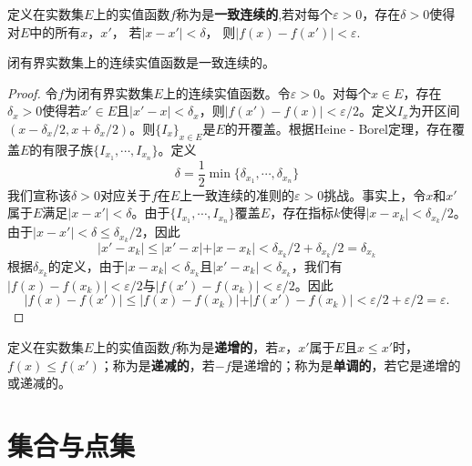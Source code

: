 \documentclass[lang=cn,newtx,10pt,scheme=chinese]{../Template/elegantbook}
\begin{document}
\begin{definition}[一致连续]\label{definition:一致连续}
  定义在实数集\(E\)上的实值函数\(f\)称为是\textbf{一致连续的},若对每个\(\varepsilon>0\)，存在\(\delta>0\)使得对\(E\)中的所有\(x\)，\(x'\)，
若\(\vert x - x'\vert<\delta\)， 则\(\vert f(x) - f(x')\vert<\varepsilon.\)
\end{definition}

\begin{theorem}\label{theorem:闭有界实数集上的连续实值函数是一致连续的。}
  闭有界实数集上的连续实值函数是一致连续的。
\end{theorem}
\begin{proof}
  令\(f\)为闭有界实数集\(E\)上的连续实值函数。令\(\varepsilon>0\)。对每个\(x\in E\)，存在\(\delta_x>0\)使得若\(x'\in E\)且\(\vert x' - x\vert<\delta_x\)，则\(\vert f(x') - f(x)\vert<\varepsilon/2\)。定义\(I_x\)为开区间\((x - \delta_x/2, x+\delta_x/2)\)。则\(\{I_x\}_{x\in E}\)是\(E\)的开覆盖。根据Heine - Borel定理，存在覆盖\(E\)的有限子族\(\{I_{x_1}, \cdots, I_{x_n}\}\)。定义
\[
\delta=\frac{1}{2}\min\{\delta_{x_1},\cdots,\delta_{x_n}\}
\]
我们宣称该\(\delta>0\)对应关于\(f\)在\(E\)上一致连续的准则的\(\varepsilon>0\)挑战。事实上，令\(x\)和\(x'\)属于\(E\)满足\(\vert x - x'\vert<\delta\)。由于\(\{I_{x_1}, \cdots, I_{x_n}\}\)覆盖\(E\)，存在指标\(k\)使得\(\vert x - x_k\vert<\delta_{x_k}/2\)。由于\(\vert x - x'\vert<\delta\leqslant\delta_{x_k}/2\)，因此
\[
\vert x' - x_k\vert\leqslant\vert x' - x\vert+\vert x - x_k\vert<\delta_{x_k}/2+\delta_{x_k}/2=\delta_{x_k}
\]
根据\(\delta_{x_k}\)的定义，由于\(\vert x - x_k\vert<\delta_{x_k}\)且\(\vert x' - x_k\vert<\delta_{x_k}\)，我们有\(\vert f(x) - f(x_k)\vert<\varepsilon/2\)与\(\vert f(x') - f(x_k)\vert<\varepsilon/2\)。因此
\[
\vert f(x) - f(x')\vert\leqslant\vert f(x) - f(x_k)\vert+\vert f(x') - f(x_k)\vert<\varepsilon/2+\varepsilon/2=\varepsilon.
\]
\end{proof}

\begin{definition}[实值函数的单调性]\label{definition:实值函数的单调性}
  定义在实数集\(E\)上的实值函数\(f\)称为是\textbf{递增的}，若\(x\)，\(x'\)属于\(E\)且\(x\leqslant x'\)时，\(f(x)\leqslant f(x')\)；称为是\textbf{递减的}，若\(-f\)是递增的；称为是\textbf{单调的}，若它是递增的或递减的。
\end{definition}




\chapter{集合与点集}
\end{document}
